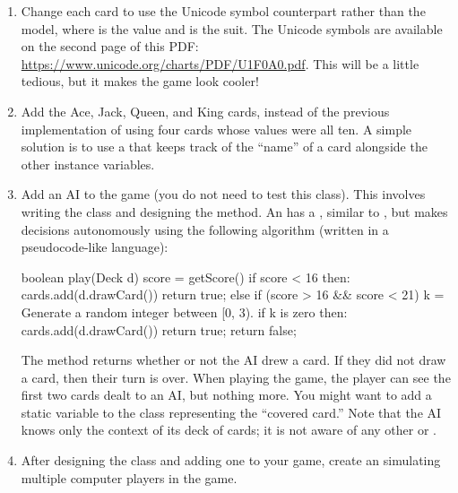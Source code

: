 \begin{enumerate}[label=(\alph*)]
    \item Change each card to use the Unicode symbol counterpart rather than the   model, where  is the value and  is the suit. The Unicode symbols are available on the second page of this PDF: \url{https://www.unicode.org/charts/PDF/U1F0A0.pdf}. This will be a little tedious, but it makes the game look cooler!
    \item Add the Ace, Jack, Queen, and King cards, instead of the previous implementation of using four cards whose values were all ten. A simple solution is to use a  that keeps track of the ``name'' of a card alongside the other instance variables. 
    \item Add an AI to the game (you do not need to test this class). This involves writing the  class and designing the  method. An  has a , similar to , but makes decisions autonomously using the following algorithm (written in a pseudocode-like language):
    \begin{verbnobox}[\small]
boolean play(Deck d) {
  score = getScore()
  if score < 16 then:
    cards.add(d.drawCard())
    return true;
  else if (score > 16 && score < 21) {
    k = Generate a random integer between [0, 3).
    if k is zero then:
      cards.add(d.drawCard())
      return true;
  } 
  return false;
}
\end{verbnobox}
The method returns whether or not the AI drew a card. If they did not draw a card, then their turn is over. When playing the game, the player can see the first two cards dealt to an AI, but nothing more. You might want to add a static variable to the  class representing the ``covered card.'' Note that the AI knows only the context of its deck of cards; it is not aware of any other  or .
\item After designing the  class and adding one to your game, create an  simulating multiple computer players in the game.
\end{enumerate}


